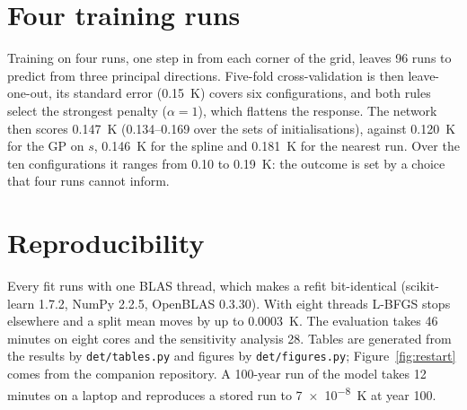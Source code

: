 \documentclass[11pt,a4paper]{article}
\begin{document}
\section{Four training runs}
\label{app:four}

Training on four runs, one step in from each corner of the grid, leaves 96 runs to predict from three principal
directions. Five-fold cross-validation is then leave-one-out, its standard error (\SI{0.15}{K}) covers six
configurations, and both rules select the strongest penalty ($\alpha = 1$), which flattens the response. The
network then scores \SI{0.147}{K} (0.134--0.169 over the sets of initialisations), against \SI{0.120}{K} for the
GP on $s$, \SI{0.146}{K} for the spline and \SI{0.181}{K} for the nearest run. Over the ten configurations it
ranges from 0.10 to \SI{0.19}{K}: the outcome is set by a choice that four runs cannot inform.

\section{Reproducibility}

Every fit runs with one BLAS thread, which makes a refit bit-identical (scikit-learn 1.7.2, NumPy 2.2.5, OpenBLAS
0.3.30). With eight threads L-BFGS stops elsewhere and a split mean moves by up to \SI{0.0003}{K}. The evaluation
takes 46 minutes on eight cores and the sensitivity analysis 28. Tables are generated from the results by
\texttt{det/tables.py} and figures by \texttt{det/figures.py}; Figure~\ref{fig:restart} comes from the companion
repository. A 100-year run of the model takes 12 minutes on a laptop and reproduces a stored run to
\SI{7e-8}{K} at year 100.
\end{document}
